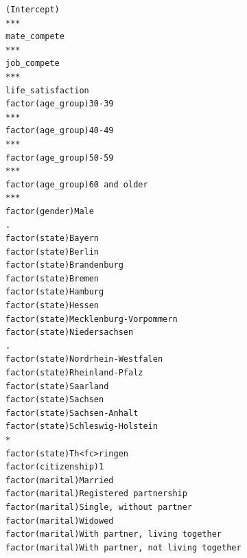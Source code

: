 \documentclass[
]{article}
\begin{document}
\begin{table}
\begin{minipage}[t]{\linewidth}
{\begin{verbatim}
(Intercept)                                                                       ***
mate_compete                                                                      ***
job_compete                                                                       ***
life_satisfaction                                                                    
factor(age_group)30-39                                                            ***
factor(age_group)40-49                                                            ***
factor(age_group)50-59                                                            ***
factor(age_group)60 and older                                                     ***
factor(gender)Male                                                                .  
factor(state)Bayern                                                                  
factor(state)Berlin                                                                  
factor(state)Brandenburg                                                             
factor(state)Bremen                                                                  
factor(state)Hamburg                                                                 
factor(state)Hessen                                                                  
factor(state)Mecklenburg-Vorpommern                                                  
factor(state)Niedersachsen                                                        .  
factor(state)Nordrhein-Westfalen                                                     
factor(state)Rheinland-Pfalz                                                         
factor(state)Saarland                                                                
factor(state)Sachsen                                                                 
factor(state)Sachsen-Anhalt                                                          
factor(state)Schleswig-Holstein                                                   *  
factor(state)Th<fc>ringen                                                            
factor(citizenship)1                                                                 
factor(marital)Married                                                               
factor(marital)Registered partnership                                                
factor(marital)Single, without partner                                               
factor(marital)Widowed                                                               
factor(marital)With partner, living together                                         
factor(marital)With partner, not living together                                     

\end{verbatim}}
\end{minipage}
\end{table}
\end{document}
